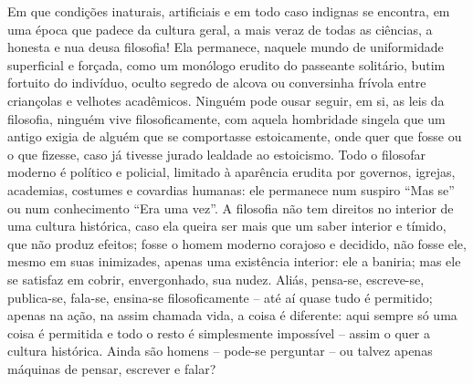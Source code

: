 Em que condições inaturais, artificiais e em todo caso indignas se
encontra, em uma época que padece da cultura geral, a mais veraz de
todas as ciências, a honesta e nua deusa filosofia! Ela permanece,
naquele mundo de uniformidade superficial e forçada, como um monólogo
erudito do passeante solitário, butim fortuito do indivíduo, oculto
segredo de alcova ou conversinha frívola entre criançolas e velhotes
acadêmicos. Ninguém pode ousar seguir, em si, as leis da filosofia,
ninguém vive filosoficamente, com aquela hombridade singela que um
antigo exigia de alguém que se comportasse estoicamente, onde quer que
fosse ou o que fizesse, caso já tivesse jurado lealdade ao estoicismo.\label{lealdadeaoestoicismo}
Todo o filosofar moderno é político e policial, limitado à aparência
erudita por governos, igrejas, academias, costumes e covardias humanas:
ele permanece num suspiro ``Mas se'' ou num conhecimento ``Era uma
vez''. A filosofia não tem direitos no interior de uma cultura
histórica, caso ela queira ser mais que um saber interior e tímido, que
não produz efeitos; fosse o homem moderno corajoso e decidido, não fosse
ele, mesmo em suas inimizades, apenas uma existência interior: ele a
baniria; mas ele se satisfaz em cobrir, envergonhado, sua nudez. Aliás,
pensa-se, escreve-se, publica-se, fala-se, ensina-se filosoficamente --
até aí quase tudo é permitido; apenas na ação, na assim chamada vida, a
coisa é diferente: aqui sempre só uma coisa é permitida e todo o resto é
simplesmente impossível -- assim o quer a cultura histórica. Ainda são
homens -- pode-se perguntar -- ou talvez apenas máquinas de pensar, escrever
e falar?

